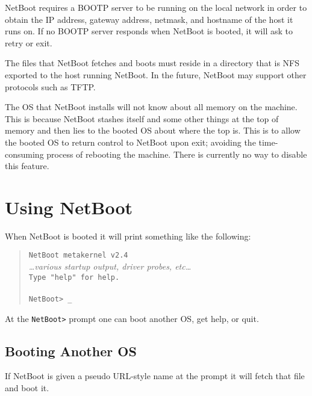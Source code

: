 NetBoot requires a BOOTP server to be running on the local network
in order to obtain the IP address, gateway address, netmask, and hostname
of the host it runs on.
If no BOOTP server responds when NetBoot is booted,
it will ask to retry or exit.

The files that NetBoot fetches and boots must reside in a directory
that is NFS exported to the host running NetBoot.
In the future, NetBoot may support other protocols such as TFTP.

The OS that NetBoot installs will not know about all memory on the machine.
This is because NetBoot stashes itself and some other things
at the top of memory and then lies to the booted OS about where the top is.
This is to allow the booted OS to return control to NetBoot upon exit;
avoiding the time-consuming process of rebooting the machine.
There is currently no way to disable this feature.

\section{Using NetBoot}

When NetBoot is booted it will print something like the following:
\begin{quote}
\texttt{NetBoot metakernel v2.4}\\
\textsl{\ldots{}various startup output, driver probes, etc\ldots{}}\\
\texttt{Type "help" for help.}\\
\\
\texttt{NetBoot> _}
\end{quote}
At the \texttt{NetBoot>} prompt one can boot another OS,
get help,
or quit.

\subsection{Booting Another OS}

If NetBoot is given a pseudo URL-style name at the prompt it will fetch
that file and boot it.


